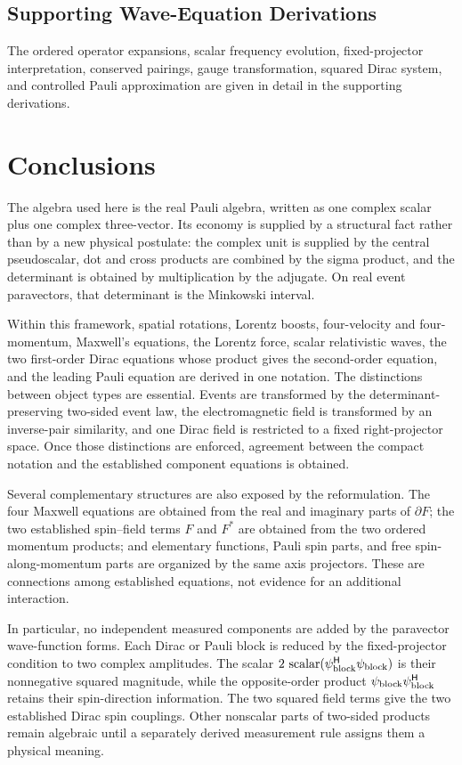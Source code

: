 \documentclass[10pt,letterpaper]{article}
\let\STAamsmathtext\text
\newcommand{\eqtext}[1]{\STAamsmathtext{\normalfont\rmfamily #1}}
\newcommand{\eqfunc}[1]{\operatorname{#1}}
\renewcommand{\text}[1]{\STAamsmathtext{\normalfont\rmfamily #1}}
\newcommand{\pv}[1]{#1}
\newcommand{\Hop}{\mathsf H}
\newcommand{\herm}[1]{#1^{\Hop}}
\newcommand{\conj}[1]{#1^{*}}
\begin{document}
\subsection{Supporting Wave-Equation Derivations}
The ordered operator expansions, scalar frequency evolution,
fixed-projector interpretation, conserved pairings, gauge transformation,
squared Dirac system, and controlled Pauli approximation are given in detail
in the supporting derivations.


\section{Conclusions}\label{sec:conclusions}\label{sec:synthesis}
The algebra used here is the real Pauli algebra, written as one complex scalar plus one complex three-vector. Its economy is supplied by a structural fact rather than by a new physical postulate: the complex unit is supplied by the central pseudoscalar, dot and cross products are combined by the sigma product, and the determinant is obtained by multiplication by the adjugate. On real event paravectors, that determinant is the Minkowski interval.

Within this framework, spatial rotations, Lorentz boosts, four-velocity and
four-momentum, Maxwell's equations, the Lorentz force, scalar relativistic
waves, the two first-order Dirac equations whose product gives the
second-order equation, and the leading Pauli equation are derived in one
notation. The distinctions between object types are essential. Events are
transformed by the determinant-preserving two-sided event law, the
electromagnetic field is transformed by an inverse-pair similarity, and one
Dirac field is restricted to a fixed right-projector space. Once those
distinctions are enforced, agreement between the compact notation and the
established component equations is obtained.

Several complementary structures are also exposed by the reformulation. The
four Maxwell equations are obtained from the real and imaginary parts of
\(\pv{\partial}\pv{F}\); the two established spin--field terms
\(\pv{F}\) and \(\conj{\pv{F}}\) are obtained from the two ordered momentum
products; and elementary functions, Pauli spin parts, and free
spin-along-momentum parts are organized by the same axis projectors. These
are connections among established equations, not evidence for an additional
interaction.

In particular, no independent measured components are added by the
paravector wave-function forms. Each Dirac or Pauli block is reduced by the
fixed-projector condition to two complex amplitudes. The scalar
\(2\,\eqfunc{scalar}(
\herm{\pv{\psi}_{\eqtext{block}}}\pv{\psi}_{\eqtext{block}}
)\) is their nonnegative
squared magnitude, while the opposite-order product
\(\pv{\psi}_{\eqtext{block}}
\herm{\pv{\psi}_{\eqtext{block}}}\) retains their spin-direction
information. The
two squared field terms give the two established Dirac spin couplings. Other
nonscalar parts of two-sided products
remain algebraic until a separately derived measurement rule assigns them a
physical meaning.
\end{document}
